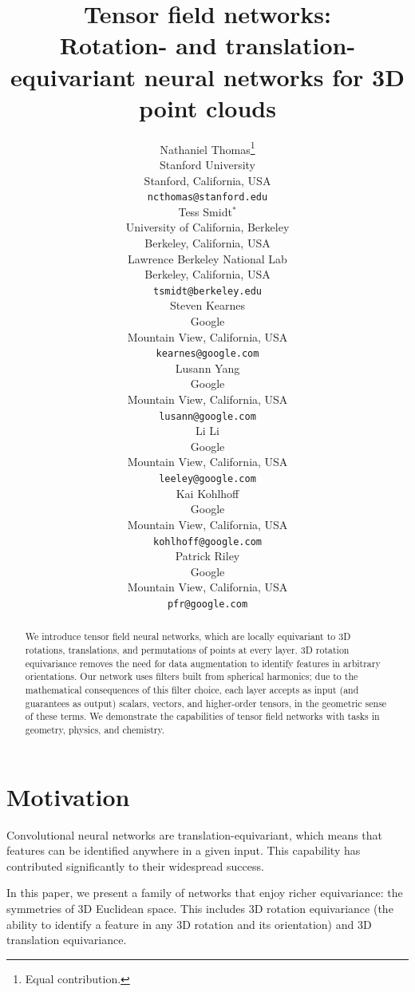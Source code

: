 \documentclass{article}
\title{Tensor field networks:\\Rotation- and translation-equivariant neural networks for 3D point clouds}
\author{
  Nathaniel Thomas\thanks{Equal contribution.} \\
  Stanford University \\
  Stanford, California, USA \\
  \texttt{ncthomas@stanford.edu} \\
  \And
  Tess Smidt$^{*}$ \\
  University of California, Berkeley \\
  Berkeley, California, USA \\
  Lawrence Berkeley National Lab \\
  Berkeley, California, USA \\
  \texttt{tsmidt@berkeley.edu} \\
  \And
  Steven Kearnes \\
  Google \\
  Mountain View, California, USA \\
  \texttt{kearnes@google.com} \\
  \And
  Lusann Yang \\
  Google \\
  Mountain View, California, USA \\
  \texttt{lusann@google.com} \\
  \And
  Li Li \\
  Google \\
  Mountain View, California, USA \\
  \texttt{leeley@google.com} \\
  \And
  Kai Kohlhoff \\
  Google \\
  Mountain View, California, USA \\
  \texttt{kohlhoff@google.com} \\
  \And
  Patrick Riley \\
  Google \\
  Mountain View, California, USA \\
  \texttt{pfr@google.com} \\
}
\begin{document}

\maketitle

\begin{abstract}
We introduce tensor field neural networks, which are locally equivariant to 3D rotations, translations, and permutations of points at every layer. 3D rotation equivariance removes the need for data augmentation to identify features in arbitrary orientations. Our network uses filters built from spherical harmonics; due to the mathematical consequences of this filter choice, each layer accepts as input (and guarantees as output) scalars, vectors, and higher-order tensors, in the geometric sense of these terms.  We demonstrate the capabilities of tensor field networks with tasks in geometry, physics, and chemistry.
% 
% 
% 
\end{abstract}

\section{Motivation} \label{sec:motivation}

Convolutional neural networks are translation-equivariant, which means that features can be identified anywhere in a given input.  This capability has contributed significantly to their widespread success.

In this paper, we present a family of networks that enjoy richer equivariance: the symmetries of 3D Euclidean space. This includes 3D rotation equivariance (the ability to identify a feature in any 3D rotation and its orientation) and 3D translation equivariance.
\end{document}
